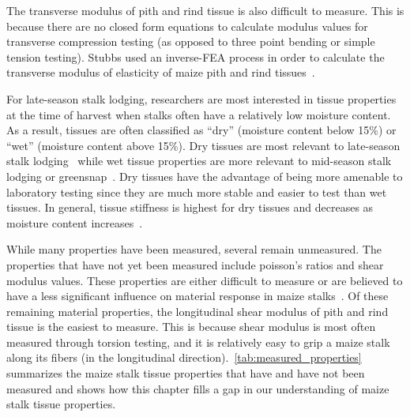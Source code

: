 The transverse modulus of pith and rind tissue is also difficult to measure. This is because there are no closed form equations to calculate modulus values for transverse compression testing (as opposed to three point bending or simple tension testing). Stubbs used an inverse-FEA process in order to calculate the transverse modulus of elasticity of maize pith and rind tissues~. 

For late-season stalk lodging, researchers are most interested in tissue properties at the time of harvest when stalks often have a relatively low moisture content.  As a result, tissues are often classified as “dry” (moisture content below 15\%) or “wet” (moisture content above 15\%). Dry tissues are most relevant to late-season stalk lodging~ while wet tissue properties are more relevant to mid-season stalk lodging or greensnap~. Dry tissues have the advantage of being more amenable to laboratory testing since they are much more stable and easier to test than wet tissues. In general, tissue stiffness is highest for dry tissues and decreases as moisture content increases~.

While many properties have been measured, several remain unmeasured. The properties that have not yet been measured include poisson’s ratios and shear modulus values. These properties are either difficult to measure or are believed to have a less significant influence on material response in maize stalks~. Of these remaining material properties, the longitudinal shear modulus of pith and rind tissue is the easiest to measure. This is because shear modulus is most often measured through torsion testing, and it is relatively easy to grip a maize stalk along its fibers (in the longitudinal direction).~\cref{tab:measured_properties} summarizes the maize stalk tissue properties that have and have not been measured and shows how this chapter fills a gap in our understanding of maize stalk tissue properties. 
\newline

